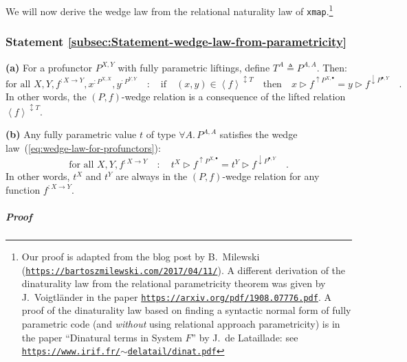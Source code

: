 We will now derive the wedge law from the relational naturality law
of \lstinline!xmap!.\footnote{Our proof is adapted from the blog post by B.~Milewski
(\texttt{\href{https://bartoszmilewski.com/2017/04/11/}{https://bartoszmilewski.com/2017/04/11/}}).
A different derivation of the dinaturality law from the relational
parametricity theorem was given by J.~Voigtl\"ander
in the paper \texttt{\href{https://arxiv.org/pdf/1908.07776.pdf}{https://arxiv.org/pdf/1908.07776.pdf}}.
A proof of the dinaturality law based on finding a syntactic normal
form of fully parametric code (and \emph{without} using relational
approach parametricity) is in the paper \textsf{``}Dinatural terms in System
$F$\textsf{''} by J.~de Lataillade: see \texttt{\href{https://www.irif.fr/~delatail/dinat.pdf}{https://www.irif.fr/$\sim$delatail/dinat.pdf}}} 

\subsubsection{Statement \label{subsec:Statement-wedge-law-from-parametricity}\ref{subsec:Statement-wedge-law-from-parametricity}}

\textbf{(a)} For a profunctor $P^{X,Y}$ with fully parametric liftings,
define $T^{A}\triangleq P^{A,A}$. Then:
\[
\text{for all }X,Y,f^{:X\rightarrow Y},x^{:P^{X,X}},y^{:P^{Y,Y}}\quad:\quad\text{if}\quad(x,y)\in\left<f\right>^{\updownarrow T}\quad\text{then}\quad x\triangleright f^{\uparrow P^{X,\bullet}}=y\triangleright f^{\downarrow P^{\bullet,Y}}\quad.
\]
In other words, the $\left(P,f\right)$-wedge relation is a consequence
of the lifted relation $\left<f\right>^{\updownarrow T}$.

\textbf{(b)} Any fully parametric value $t$ of type $\forall A.\,P^{A,A}$
satisfies the wedge law~(\ref{eq:wedge-law-for-profunctors}):
\[
\text{for all }X,Y,f^{:X\rightarrow Y}\quad:\quad t^{X}\triangleright f^{\uparrow P^{X,\bullet}}=t^{Y}\triangleright f^{\downarrow P^{\bullet,Y}}\quad.
\]
In other words, $t^{X}$ and $t^{Y}$ are always in the $(P,f)$-wedge
relation for any function $f^{:X\rightarrow Y}$.

\subparagraph{Proof}

